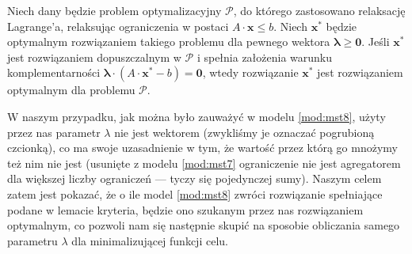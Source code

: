 \begin{lemma}
	Niech dany będzie problem optymalizacyjny $\mathcal{P}$, do którego zastosowano relaksację Lagrange'a, relaksując ograniczenia w postaci $A \cdot \textbf{x} \leqslant b$. Niech $\textbf{x}^{\ast}$ będzie optymalnym rozwiązaniem takiego problemu dla pewnego wektora $\boldsymbol{\lambda} \geqslant \textbf{0}$. Jeśli $\textbf{x}^{\ast}$ jest rozwiązaniem dopuszczalnym w $\mathcal{P}$ i spełnia założenia warunku komplementarności $\boldsymbol{\lambda} \cdot \left( A \cdot \textbf{x}^{\ast} - b \right) = \textbf{0}$, wtedy rozwiązanie $\textbf{x}^{\ast}$ jest rozwiązaniem optymalnym dla problemu $\mathcal{P}$.
\end{lemma}

W naszym przypadku, jak można było zauważyć w modelu \ref{mod:mst8}, użyty przez nas parametr $\lambda$ nie jest wektorem (zwykliśmy je oznaczać pogrubioną czcionką), co ma swoje uzasadnienie w tym, że wartość przez którą go mnożymy też nim nie jest (usunięte z modelu \ref{mod:mst7} ograniczenie nie jest agregatorem dla większej liczby ograniczeń --- tyczy się pojedynczej sumy). Naszym celem zatem jest pokazać, że o ile model \ref{mod:mst8} zwróci rozwiązanie spełniające podane w lemacie kryteria, będzie ono szukanym przez nas rozwiązaniem optymalnym, co pozwoli nam się następnie skupić na sposobie obliczania samego parametru $\lambda$ dla minimalizującej funkcji celu.

